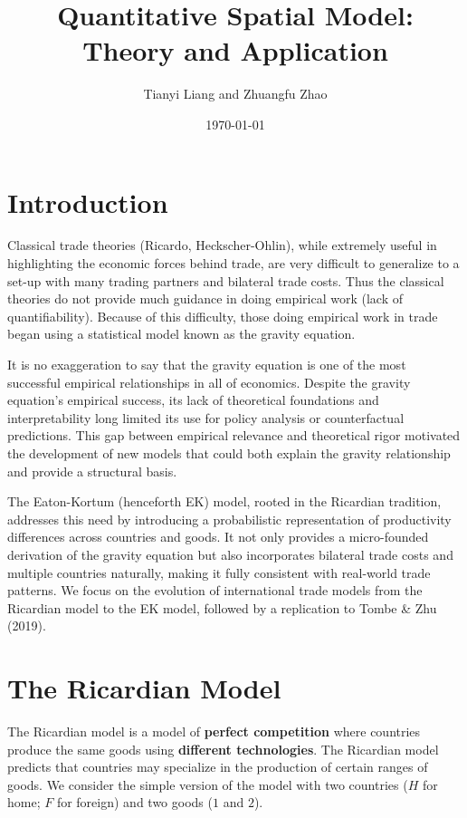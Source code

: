 \documentclass[fontset=windows]{article}
\title{\heiti\zihao{2} Quantitative Spatial Model: Theory and Application}
\author{\songti Tianyi Liang and Zhuangfu Zhao}
\date{\today}
\numberwithin{equation}{section}
\numberwithin{figure}{section}
\theoremstyle{plain}
\numberwithin{theorem}{section}
\numberwithin{lemma}{section}
\numberwithin{corollary}{section}
\numberwithin{definition}{section}
\numberwithin{proposition}{section}
\numberwithin{example}{section}
\numberwithin{assumption}{section}
\begin{document}
\maketitle
\thispagestyle{empty}

\setcounter{tocdepth}{2}
\tableofcontents


\section{Introduction}

\noindent Classical trade theories (Ricardo, Heckscher-Ohlin), while extremely useful in highlighting the economic forces behind trade, 
are very difficult to generalize to a set-up with many trading partners and bilateral trade costs. 
Thus the classical theories do not provide much guidance in doing empirical work (lack of quantifiability). Because of this difficulty, 
those doing empirical work in trade began using a statistical model known as the gravity equation. 

It is no exaggeration to say that the gravity equation is one of the most successful empirical relationships in all of economics. 
Despite the gravity equation's empirical success, its lack of theoretical foundations and interpretability long limited its use for policy analysis or counterfactual predictions. 
This gap between empirical relevance and theoretical rigor motivated the development of new models that could both explain the gravity relationship and provide a structural basis. 

The Eaton-Kortum (henceforth EK) model, rooted in the Ricardian tradition, addresses this need by introducing a probabilistic representation of productivity differences across countries and goods. 
It not only provides a micro-founded derivation of the gravity equation but also incorporates bilateral trade costs and multiple countries naturally, 
making it fully consistent with real-world trade patterns. We focus on the evolution of international trade models from the Ricardian model to 
the EK model, followed by a replication to Tombe \& Zhu (2019).


\section{The Ricardian Model}

\noindent The Ricardian model is a model of \textbf{perfect competition} where countries produce the same goods using \textbf{different technologies}. 
The Ricardian model predicts that countries may specialize in the production of certain ranges of goods. 
We consider the simple version of the model with two countries ($H$ for home; $F$ for foreign) and two goods ($1$ and $2$). 
\end{document}
